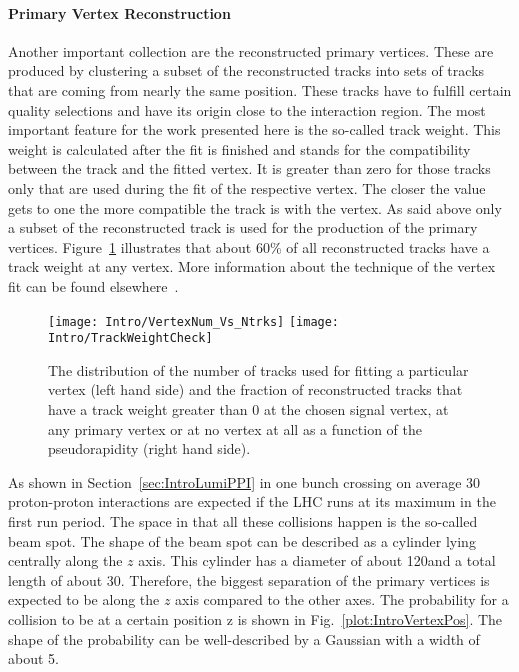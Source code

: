 \paragraph*{Primary Vertex Reconstruction}

Another important collection are the reconstructed primary vertices. These are produced by clustering a subset of the reconstructed tracks into sets of tracks that are coming from nearly the same position. These tracks have to fulfill certain quality selections and have its origin close to the interaction region. The most important feature for the work presented here is the so-called track weight. This weight is calculated after the fit is finished and stands for the compatibility between the track and the fitted vertex. It is greater than zero for those tracks only that are used during the fit of the respective vertex. The closer the value gets to one the more compatible the track is with the vertex. As said above only a subset of the reconstructed track is used for the production of the primary vertices. Figure~\ref{plot:IntroTrackWeight} illustrates that about $60\%$ of all reconstructed tracks have a track weight at any vertex.  More information about the technique of the vertex fit can be found elsewhere~\cite{CMS-PAPER-TRK-11-001}.

\begin{figure}[Htb]
    \centering
    \texttt{[image: Intro/VertexNum\_Vs\_Ntrks]}
    \texttt{[image: Intro/TrackWeightCheck]}
    \caption[Distribution of the number of tracks used to fit the primary vertices and fraction of reconstructed tracks that have a track weight at any primary vertex]{The distribution of the number of tracks used for fitting a particular vertex (left hand side) and the fraction of reconstructed tracks that have a track weight greater than 0 at the chosen signal vertex, at any primary vertex or at no vertex at all as a function of the pseudorapidity (right hand side). \label{plot:IntroTrackWeight}}
\end{figure}

As shown in Section~\ref{sec:IntroLumiPPI} in one bunch crossing on average 30 proton-proton interactions are expected if the LHC runs at its maximum in the first run period. The space in that all these collisions happen is the so-called beam spot. The shape of the beam spot can be described as a cylinder lying centrally along the $z$ axis. This cylinder has a diameter of about 120\mum and a total length of about 30\cm. Therefore, the biggest separation of the primary vertices is expected to be along the $z$ axis compared to the other axes. The probability for a collision to be at a certain position z is shown in Fig.~\ref{plot:IntroVertexPos}. The shape of the probability can be well-described by a Gaussian with a width of about 5\cm.

